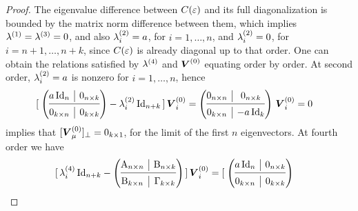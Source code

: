 \documentclass[letterpaper, reqno, 11pt]{amsart}
\theoremstyle{definition}
\theoremstyle{remark}
\numberwithin{equation}{section}
\begin{document}
\begin{proof}
The eigenvalue difference between $C(\varepsilon)$ and its full diagonalization is bounded by the matrix norm difference between them, which implies $\lambda^{(1)}=\lambda^{(3)}=0$, and also $\lambda^{(2)}_i=a$, for $i=1,\dots,n$, and $\lambda^{(2)}_i=0$, for $i=n+1,\dots,n+k$, since $C(\varepsilon)$ is already diagonal up to that order. One can obtain the relations satisfied by $\lambda^{(4)}$ and $\boldsymbol{V}^{(0)}$ equating order by order. 
At second order, $\lambda^{(2)}_i=a$ is nonzero for $i=1,\dots,n$, hence
\begin{align*}
& [\; 
\left( \begin{array}{@{}c|c@{}}
   \begin{matrix}
		a\,\Id_{n}
   \end{matrix} 
      & 0_{n\times k} \\
   \cmidrule[0.4pt]{1-2}
   0_{k\times n} & 0_{k\times k} \\
\end{array}  \right)
	-\lbd^{(2)}_i\,\Id_{n+k}\, ]\,\bs{V}^{(0)}_i =
\left( \begin{array}{@{}c|c@{}}
   \begin{matrix}
		0_{n\times n}
   \end{matrix} 
      & 0_{n\times k} \\
   \cmidrule[0.4pt]{1-2}
   0_{k\times n} & -a\,\Id_k  \\
\end{array}  \right)\,\bs{V}^{(0)}_i = 0
\end{align*}
implies that $[\boldsymbol{V}^{(0)}_\mu]_\perp=0_{k\times 1}$, for the limit of the first $n$ eigenvectors. At fourth order we have
\begin{align*}
&
[\, \lbd^{(4)}_i\,\Id_{n+k}- 
\left( \begin{array}{@{}c|c@{}}
   \begin{matrix}
		\mr{A}_{n\times n}
   \end{matrix} 
      & \mr{B}_{n\times k} \\
   \cmidrule[0.4pt]{1-2}
   \mr{B}_{k\times n} & \Gamma_{k\times k}  \\
\end{array}  \right) 
	 \, ]\,\bs{V}^{(0)}_i
=
[\; 
\left( \begin{array}{@{}c|c@{}}
   \begin{matrix}
		a\,\Id_{n}
   \end{matrix} 
      & 0_{n\times k} \\
   \cmidrule[0.4pt]{1-2}
   0_{k\times n} & 0_{k\times k}  \\
\end{array}  \right)

\end{align*}
\end{proof}
\end{document}
